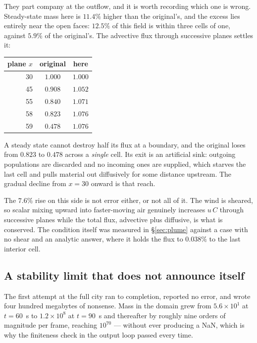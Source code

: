 \documentclass[11pt,a4paper]{article}
\begin{document}
They part company at the outflow, and it is worth recording which one is wrong.
Steady-state mass here is $11.4\%$ higher than the original's, and the excess
lies entirely near the open faces: $12.5\%$ of this field is within three cells
of one, against $5.9\%$ of the original's. The advective flux through successive
planes settles it:

\begin{center}
\begin{tabular}{rcc}
\toprule
plane $x$ & original & here \\
\midrule
30 & $1.000$ & $1.000$ \\
45 & $0.908$ & $1.052$ \\
55 & $0.840$ & $1.071$ \\
58 & $0.823$ & $1.076$ \\
59 & $0.478$ & $1.076$ \\
\bottomrule
\end{tabular}
\end{center}

\noindent A steady state cannot destroy half its flux at a boundary, and the
original loses from $0.823$ to $0.478$ across a \emph{single} cell. Its exit is
an artificial sink: outgoing populations are discarded and no incoming ones are
supplied, which starves the last cell and pulls material out diffusively for
some distance upstream. The gradual decline from $x=30$ onward is that reach.

The $7.6\%$ rise on this side is not error either, or not all of it. The wind is
sheared, so scalar mixing upward into faster-moving air genuinely increases
$u\,C$ through successive planes while the total flux, advective plus diffusive,
is what is conserved. The condition itself was measured in \S\ref{sec:plume}
against a case with no shear and an analytic answer, where it holds the flux to
$0.038\%$ to the last interior cell.

\subsection{A stability limit that does not announce itself}
\label{sec:urbanstab}

The first attempt at the full city ran to completion, reported no error, and
wrote four hundred megabytes of nonsense. Mass in the domain grew from
$5.6\times10^{1}$ at $t=60$~s to $1.2\times10^{8}$ at $t=90$~s and thereafter by
roughly nine orders of magnitude per frame, reaching $10^{70}$ --- without ever
producing a NaN, which is why the finiteness check in the output loop passed
every time.
\end{document}
